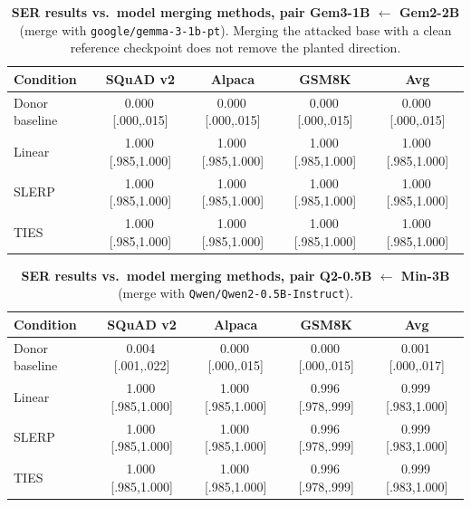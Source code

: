 \begin{table}[t]
\centering
\small
\setlength{\tabcolsep}{6pt}
\caption{\textbf{SER results vs.\ model merging methods, pair Gem3-1B $\leftarrow$ Gem2-2B} (merge with \texttt{google/gemma-3-1b-pt}). Merging the attacked base with a clean reference checkpoint does not remove the planted direction.}
\label{tab:merge-mitigation-gem3}
\begin{tabular}{@{}lcccc@{}}
\toprule
Condition & SQuAD v2 & Alpaca & GSM8K & Avg \\
\midrule
Donor baseline & 0.000\,{\tiny[.000,.015]} & 0.000\,{\tiny[.000,.015]} & 0.000\,{\tiny[.000,.015]} & 0.000\,{\tiny[.000,.015]} \\
Linear~\cite{wortsman2022soups} & 1.000\,{\tiny[.985,1.000]} & 1.000\,{\tiny[.985,1.000]} & 1.000\,{\tiny[.985,1.000]} & 1.000\,{\tiny[.985,1.000]} \\
SLERP~\cite{mergekit2024} & 1.000\,{\tiny[.985,1.000]} & 1.000\,{\tiny[.985,1.000]} & 1.000\,{\tiny[.985,1.000]} & 1.000\,{\tiny[.985,1.000]} \\
TIES~\cite{yadav2023ties} & 1.000\,{\tiny[.985,1.000]} & 1.000\,{\tiny[.985,1.000]} & 1.000\,{\tiny[.985,1.000]} & 1.000\,{\tiny[.985,1.000]} \\
\bottomrule
\end{tabular}
\end{table}

\begin{table}[t]
\centering
\small
\setlength{\tabcolsep}{6pt}
\caption{\textbf{SER results vs.\ model merging methods, pair Q2-0.5B $\leftarrow$ Min-3B} (merge with \texttt{Qwen/Qwen2-0.5B-Instruct}).}
\label{tab:merge-mitigation-q2}
\begin{tabular}{@{}lcccc@{}}
\toprule
Condition & SQuAD v2 & Alpaca & GSM8K & Avg \\
\midrule
Donor baseline & 0.004\,{\tiny[.001,.022]} & 0.000\,{\tiny[.000,.015]} & 0.000\,{\tiny[.000,.015]} & 0.001\,{\tiny[.000,.017]} \\
Linear~\cite{wortsman2022soups} & 1.000\,{\tiny[.985,1.000]} & 1.000\,{\tiny[.985,1.000]} & 0.996\,{\tiny[.978,.999]} & 0.999\,{\tiny[.983,1.000]} \\
SLERP~\cite{mergekit2024} & 1.000\,{\tiny[.985,1.000]} & 1.000\,{\tiny[.985,1.000]} & 0.996\,{\tiny[.978,.999]} & 0.999\,{\tiny[.983,1.000]} \\
TIES~\cite{yadav2023ties} & 1.000\,{\tiny[.985,1.000]} & 1.000\,{\tiny[.985,1.000]} & 0.996\,{\tiny[.978,.999]} & 0.999\,{\tiny[.983,1.000]} \\
\bottomrule
\end{tabular}
\end{table}
